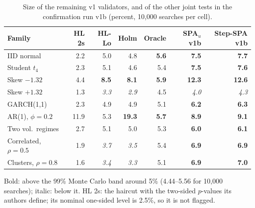 \begin{table}[t]
\centering
\small
\caption{Size of the remaining v1 validators, and of the other joint tests in the confirmation run v1b (percent, 10{,}000 searches per cell).}
\label{tab:size-more}
\begin{tabular}{lrrrrrr}
\toprule
Family & HL 2s & HL-Lo & Holm & Oracle & SPA$_u$ v1b & Step-SPA v1b \\
\midrule
IID normal & 2.2 & 5.0 & 4.8 & \textbf{5.6} & \textbf{7.5} & \textbf{7.7} \\
Student $t_4$ & 2.3 & 5.1 & 4.6 & 5.4 & \textbf{7.5} & \textbf{7.6} \\
Skew $-1.32$ & 4.4 & \textbf{8.5} & \textbf{8.1} & \textbf{5.9} & \textbf{12.3} & \textbf{12.6} \\
Skew $+1.32$ & 1.3 & \textit{3.3} & \textit{2.9} & 4.5 & \textit{4.0} & \textit{4.3} \\
GARCH(1,1) & 2.3 & 4.9 & 4.9 & 5.1 & \textbf{6.2} & \textbf{6.3} \\
AR(1), $\phi=0.2$ & 11.9 & 5.3 & \textbf{19.3} & \textbf{5.7} & \textbf{8.9} & \textbf{9.1} \\
Two vol.\ regimes & 2.7 & 5.1 & 5.0 & 5.3 & \textbf{6.0} & \textbf{6.1} \\
Correlated, $\rho=0.5$ & 1.9 & \textit{3.7} & \textit{3.5} & 5.4 & \textbf{6.9} & \textbf{6.9} \\
Clusters, $\rho=0.8$ & 1.6 & \textit{3.4} & \textit{3.3} & 5.1 & \textbf{6.9} & \textbf{7.0} \\
\bottomrule
\end{tabular}
\par\smallskip\begin{minipage}{0.97\linewidth}\footnotesize Bold: above the 99\% Monte Carlo band around 5\% (4.44--5.56 for 10{,}000 searches); italic: below it. HL 2s: the haircut with the two-sided $p$-values its authors define; its nominal one-sided level is 2.5\%, so it is not flagged.\end{minipage}
\end{table}

